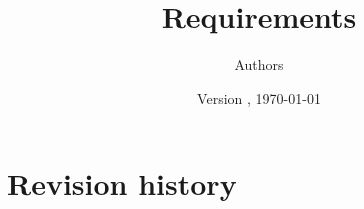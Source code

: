 \documentclass[10pt,a4paper]{article}
\title{\Large Requirements}
\author{Authors}
\date{Version \articleversion, \today}
\begin{document}
\maketitle
\statusbox
\tbdnote









\section*{Revision history}
\versiontable
\end{document}
